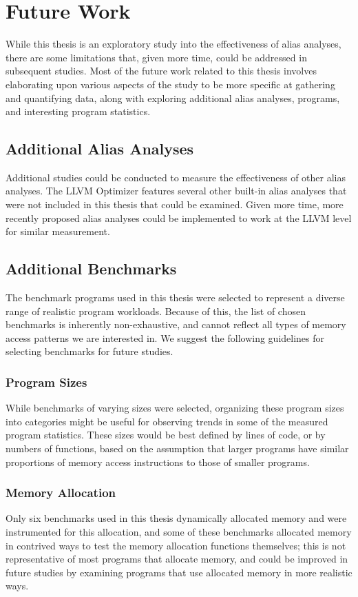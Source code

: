 \chapter{Future Work}

While this thesis is an exploratory study into the effectiveness of alias analyses, there are some limitations that, given more time, could be addressed in subsequent studies. Most of the future work related to this thesis involves elaborating upon various aspects of the study to be more specific at gathering and quantifying data, along with exploring additional alias analyses, programs, and interesting program statistics.

\section{Additional Alias Analyses}
Additional studies could be conducted to measure the effectiveness of other alias analyses. The LLVM Optimizer features several other built-in alias analyses that were not included in this thesis that could be examined. Given more time, more recently proposed alias analyses could be implemented to work at the LLVM level for similar measurement.

\section{Additional Benchmarks}
The benchmark programs used in this thesis were selected to represent a diverse range of realistic program workloads. Because of this, the list of chosen benchmarks is inherently non-exhaustive, and cannot reflect all types of memory access patterns we are interested in. We suggest the following guidelines for selecting benchmarks for future studies.

\subsection{Program Sizes}
While benchmarks of varying sizes were selected, organizing these program sizes into categories might be useful for observing trends in some of the measured program statistics. These sizes would be best defined by lines of code, or by numbers of functions, based on the assumption that larger programs have similar proportions of memory access instructions to those of smaller programs.

\subsection{Memory Allocation}
Only six benchmarks used in this thesis dynamically allocated memory and were instrumented for this allocation, and some of these benchmarks allocated memory in contrived ways to test the memory allocation functions themselves; this is not representative of most programs that allocate memory, and could be improved in future studies by examining programs that use allocated memory in more realistic ways.

